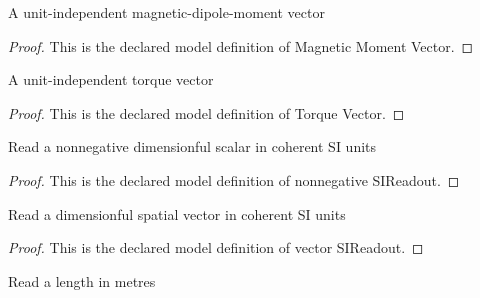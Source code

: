 \begin{definition}
  \label{def:physics:phyx-mini-0947:phyxminiproblems-problemphyxmini0947-magneticmomentvector}
  A unit-independent magnetic-dipole-moment vector
\end{definition}
\begin{proof}
  This is the declared model definition of Magnetic Moment Vector.
\end{proof}
\begin{definition}
  \label{def:physics:phyx-mini-0947:phyxminiproblems-problemphyxmini0947-torquevector}
  A unit-independent torque vector
\end{definition}
\begin{proof}
  This is the declared model definition of Torque Vector.
\end{proof}
\begin{definition}
  \label{def:physics:phyx-mini-0947:phyxminiproblems-problemphyxmini0947-nonnegativesireadout}
  Read a nonnegative dimensionful scalar in coherent SI units
\end{definition}
\begin{proof}
  This is the declared model definition of nonnegative SIReadout.
\end{proof}
\begin{definition}
  \label{def:physics:phyx-mini-0947:phyxminiproblems-problemphyxmini0947-vectorsireadout}
  Read a dimensionful spatial vector in coherent SI units
\end{definition}
\begin{proof}
  This is the declared model definition of vector SIReadout.
\end{proof}
\begin{definition}
  \label{def:physics:phyx-mini-0947:phyxminiproblems-problemphyxmini0947-lengthinmeters}
  Read a length in metres
\end{definition}
